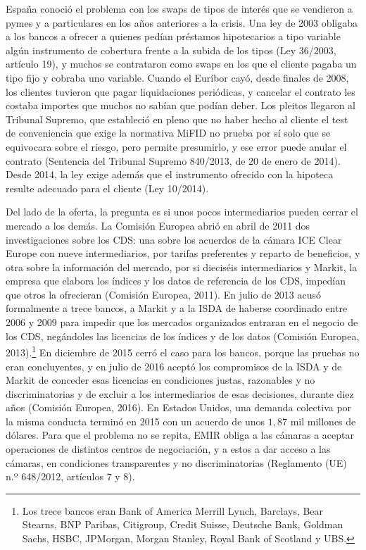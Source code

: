 \documentclass[10pt,a4paper]{article}
\begin{document}
España conoció el problema con los swaps de tipos de interés que se vendieron a pymes y a particulares en los años anteriores a la crisis. Una ley de 2003 obligaba a los bancos a ofrecer a quienes pedían préstamos hipotecarios a tipo variable algún instrumento de cobertura frente a la subida de los tipos (Ley 36/2003, artículo 19), y muchos se contrataron como swaps en los que el cliente pagaba un tipo fijo y cobraba uno variable. Cuando el Euríbor cayó, desde finales de 2008, los clientes tuvieron que pagar liquidaciones periódicas, y cancelar el contrato les costaba importes que muchos no sabían que podían deber. Los pleitos llegaron al Tribunal Supremo, que estableció en pleno que no haber hecho al cliente el test de conveniencia que exige la normativa MiFID no prueba por sí solo que se equivocara sobre el riesgo, pero permite presumirlo, y ese error puede anular el contrato (Sentencia del Tribunal Supremo 840/2013, de 20 de enero de 2014). Desde 2014, la ley exige además que el instrumento ofrecido con la hipoteca resulte adecuado para el cliente (Ley 10/2014).

Del lado de la oferta, la pregunta es si unos pocos intermediarios pueden cerrar el mercado a los demás. La Comisión Europea abrió en abril de 2011 dos investigaciones sobre los CDS: una sobre los acuerdos de la cámara ICE Clear Europe con nueve intermediarios, por tarifas preferentes y reparto de beneficios, y otra sobre la información del mercado, por si dieciséis intermediarios y Markit, la empresa que elabora los índices y los datos de referencia de los CDS, impedían que otros la ofrecieran (Comisión Europea, 2011). En julio de 2013 acusó formalmente a trece bancos, a Markit y a la ISDA de haberse coordinado entre 2006 y 2009 para impedir que los mercados organizados entraran en el negocio de los CDS, negándoles las licencias de los índices y de los datos (Comisión Europea, 2013).\footnote{%
    Los trece bancos eran Bank of America Merrill Lynch, Barclays, Bear Stearns, BNP Paribas, Citigroup, Credit Suisse, Deutsche Bank, Goldman Sachs, HSBC, JPMorgan, Morgan Stanley, Royal Bank of Scotland y UBS.
} En diciembre de 2015 cerró el caso para los bancos, porque las pruebas no eran concluyentes, y en julio de 2016 aceptó los compromisos de la ISDA y de Markit de conceder esas licencias en condiciones justas, razonables y no discriminatorias y de excluir a los intermediarios de esas decisiones, durante diez años (Comisión Europea, 2016). En Estados Unidos, una demanda colectiva por la misma conducta terminó en 2015 con un acuerdo de unos $1{,}87$ mil millones de dólares. Para que el problema no se repita, EMIR obliga a las cámaras a aceptar operaciones de distintos centros de negociación, y a estos a dar acceso a las cámaras, en condiciones transparentes y no discriminatorias (Reglamento (UE) n.º 648/2012, artículos 7 y 8).
\end{document}
